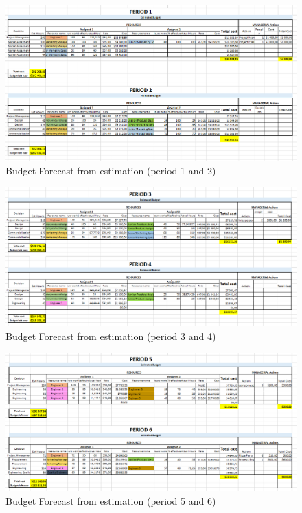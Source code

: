 \begin{appendices}
\begin{landscape}
\begin{figure}[H]
\includegraphics[scale=0.8]{budget_forecast_est_12.PNG}
\caption{Budget Forecast from estimation (period 1 and 2)}
\end{figure}
\begin{figure}[H]
\includegraphics[scale=0.8]{budget_forecast_est_34.PNG}
\caption{Budget Forecast from estimation (period 3 and 4)}
\end{figure}
\begin{figure}[H]
\includegraphics[scale=0.8]{budget_forecast_est_56.PNG}
\caption{Budget Forecast from estimation (period 5 and 6)}
\end{figure}

\end{landscape}
\end{appendices}
